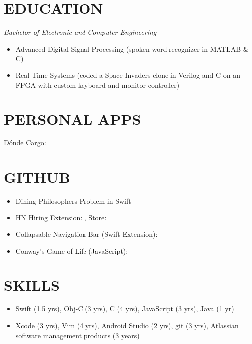 \documentclass[margin]{res}
\begin{document}
\begin{resume}
\section{EDUCATION} {\sl Bachelor of Electronic and Computer Engineering}
		\begin{itemize}
                \item Advanced Digital Signal Processing (spoken word recognizer 
                in MATLAB \& C)
                \item Real-Time Systems (coded a Space Invaders clone in Verilog
                 and C on an FPGA with custom keyboard and monitor controller)
                 \end{itemize}

\section{PERSONAL APPS}
		D\'onde Cargo: \\


\section{GITHUB}       
	\begin{itemize} 
	    \item Dining Philosophers Problem in Swift 
	    \item HN Hiring Extension: , Store: 
	    \item Collapsable Navigation Bar (Swift Extension): 
	    \item Conway's Game of Life (JavaScript): 
	\end{itemize}
                
\section{SKILLS} 
	\begin{itemize}
	\item Swift (1.5 yrs), Obj-C (3 yrs), C (4 yrs), JavaScript (3 yrs), Java (1 yr)
	\item Xcode (3 yrs), Vim (4 yrs), Android Studio (2 yrs), git (3 yrs), Atlassian software management products (3 years) 
	\end{itemize}

\end{resume}
\end{document}
